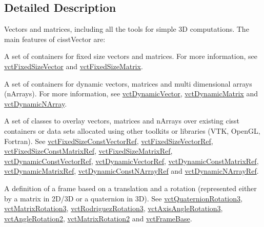 \subsection{Detailed Description}
Vectors and matrices, including all the tools for simple 3\+D computations. The main features of cisst\+Vector are\+:


\begin{DoxyItemize}
\item A set of containers for fixed size vectors and matrices. For more information, see \hyperlink{classvct_fixed_size_vector}{vct\+Fixed\+Size\+Vector} and \hyperlink{classvct_fixed_size_matrix}{vct\+Fixed\+Size\+Matrix}.
\item A set of containers for dynamic vectors, matrices and multi dimensional arrays (n\+Arrays). For more information, see \hyperlink{classvct_dynamic_vector}{vct\+Dynamic\+Vector}, \hyperlink{classvct_dynamic_matrix}{vct\+Dynamic\+Matrix} and \hyperlink{classvct_dynamic_n_array}{vct\+Dynamic\+N\+Array}.
\item A set of classes to overlay vectors, matrices and n\+Arrays over existing cisst containers or data sets allocated using other toolkits or libraries (V\+T\+K, Open\+G\+L, Fortran). See \hyperlink{classvct_fixed_size_const_vector_ref}{vct\+Fixed\+Size\+Const\+Vector\+Ref}, \hyperlink{classvct_fixed_size_vector_ref}{vct\+Fixed\+Size\+Vector\+Ref}, \hyperlink{classvct_fixed_size_const_matrix_ref}{vct\+Fixed\+Size\+Const\+Matrix\+Ref}, \hyperlink{classvct_fixed_size_matrix_ref}{vct\+Fixed\+Size\+Matrix\+Ref}, \hyperlink{classvct_dynamic_const_vector_ref}{vct\+Dynamic\+Const\+Vector\+Ref}, \hyperlink{classvct_dynamic_vector_ref}{vct\+Dynamic\+Vector\+Ref}, \hyperlink{classvct_dynamic_const_matrix_ref}{vct\+Dynamic\+Const\+Matrix\+Ref}, \hyperlink{classvct_dynamic_matrix_ref}{vct\+Dynamic\+Matrix\+Ref}, \hyperlink{classvct_dynamic_const_n_array_ref}{vct\+Dynamic\+Const\+N\+Array\+Ref} and \hyperlink{classvct_dynamic_n_array_ref}{vct\+Dynamic\+N\+Array\+Ref}.
\item A definition of a frame based on a translation and a rotation (represented either by a matrix in 2\+D/3\+D or a quaternion in 3\+D). See \hyperlink{classvct_quaternion_rotation3}{vct\+Quaternion\+Rotation3}, \hyperlink{classvct_matrix_rotation3}{vct\+Matrix\+Rotation3}, \hyperlink{classvct_rodriguez_rotation3}{vct\+Rodriguez\+Rotation3}, \hyperlink{classvct_axis_angle_rotation3}{vct\+Axis\+Angle\+Rotation3}, \hyperlink{classvct_angle_rotation2}{vct\+Angle\+Rotation2}, \hyperlink{classvct_matrix_rotation2}{vct\+Matrix\+Rotation2} and \hyperlink{classvct_frame_base}{vct\+Frame\+Base}.

\end{DoxyItemize}
